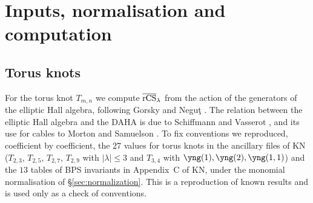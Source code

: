\section{Inputs, normalisation and computation}\label{sec:inputs}

\subsection{Torus knots}
For the torus knot $T_{m,n}$ we compute $\overline{\mathrm{rCS}}_\lambda$ from the action of the generators of the elliptic Hall algebra, following Gorsky and Negu\c{t} \cite{Gorsky13b}.
The relation between the elliptic Hall algebra and the DAHA is due to Schiffmann and Vasserot \cite{Schiffmann09}, and its use for cables to Morton and Samuelson \cite{Morton14}.
To fix conventions we reproduced, coefficient by coefficient, the $27$ values for torus knots in the ancillary files of KN~\cite{Kameyama17}
($T_{2,3}$, $T_{2,5}$, $T_{2,7}$, $T_{2,9}$ with $|\lambda|\le3$ and $T_{3,4}$ with $\yng(1),\yng(2),\yng(1,1)$)
and the $13$ tables of BPS invariants in Appendix~C of KN, under the monomial normalisation of \S\ref{sec:normalization}.
This is a reproduction of known results and is used only as a check of conventions.

